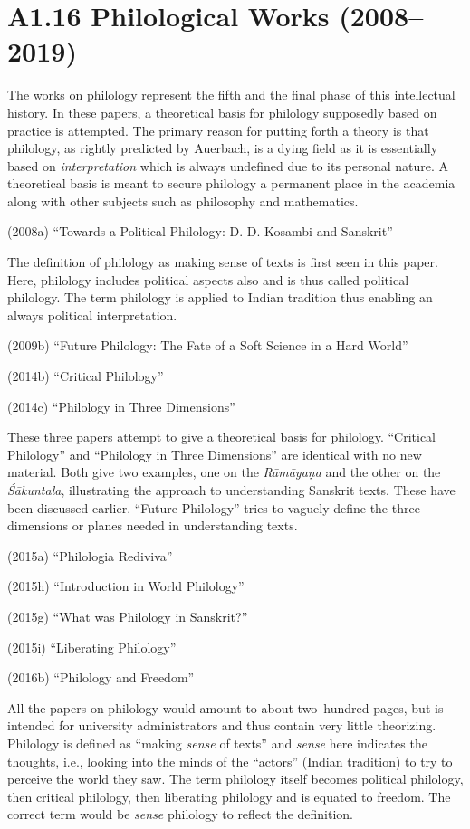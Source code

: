 {{{\newpage

\section*{A1.16 Philological Works (2008–2019)}

The works on philology represent the fifth and the final phase of this intellectual history. In these papers, a theoretical basis for philology supposedly based on practice is attempted. The primary reason for putting forth a theory is that philology, as rightly predicted by Auerbach, is a dying field as it is essentially based on \textit{interpretation} which is always undefined due to its personal nature. A theoretical basis is meant to secure philology a permanent place in the academia along with other subjects such as philosophy and mathematics.

(2008a) “Towards a Political Philology: D. D. Kosambi and Sanskrit”

The definition of philology as making sense of texts is first seen in this paper. Here, philology includes political aspects also and is thus called political philology. The term philology is applied to Indian tradition thus enabling an always political interpretation.

(2009b) “Future Philology: The Fate of a Soft Science in a Hard World”

(2014b) “Critical Philology”

(2014c) “Philology in Three Dimensions”

These three papers attempt to give a theoretical basis for philology. “Critical Philology” and “Philology in Three Dimensions” are identical with no new material. Both give two examples, one on the \textit{Rāmāyaṇa} and the other on the \textit{Śākuntala}, illustrating the approach to understanding Sanskrit texts. These have been discussed earlier. “Future Philology” tries to vaguely define the three dimensions or planes needed in understanding texts.

(2015a) “Philologia Rediviva”

(2015h) “Introduction in World Philology”

(2015g) “What was Philology in Sanskrit?”

(2015i) “Liberating Philology”

(2016b) “Philology and Freedom”


All the papers on philology would amount to about two–hundred pages, but is intended for university administrators and thus contain very little theorizing. Philology is defined as “making \textit{sense} of texts” and \textit{sense} here indicates the thoughts, i.e., looking into the minds of the “actors” (Indian tradition) to try to perceive the world they saw. The term philology itself becomes political philology, then critical philology, then liberating philology and is equated to freedom. The correct term would be \textit{sense} philology to reflect the definition.

}}}
